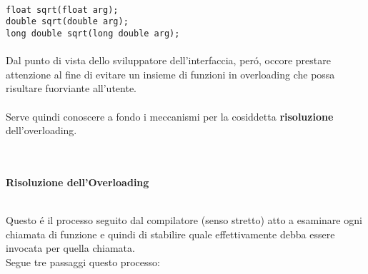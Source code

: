 \documentclass{article}
\begin{document}
\\ \texttt{float sqrt(float arg); \\ double sqrt(double arg); \\ long double sqrt(long double arg);} \\ \\
Dal punto di vista dello sviluppatore dell'interfaccia, per\'o, occore prestare attenzione al fine di evitare un insieme di funzioni in overloading che possa risultare fuorviante all'utente.\\ \\Serve quindi conoscere a fondo i meccanismi per la cosiddetta \textbf{risoluzione} dell'overloading.
\\ \\ \\
\begin{large}\textbf{\textcolor{blu}{Risoluzione dell'Overloading}} \\ \\ \end{large}
Questo \'e il processo seguito dal compilatore (senso stretto) atto a esaminare ogni chiamata di funzione e quindi di stabilire quale effettivamente debba essere invocata per quella chiamata. \\Segue tre passaggi questo processo: \\
\end{document}
